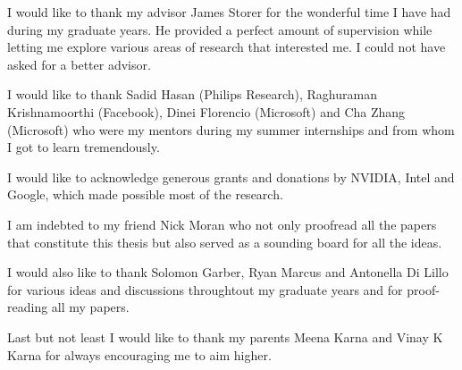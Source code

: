 I would like to thank my advisor James Storer for the wonderful time I have had during my graduate years. He provided a perfect amount of supervision while letting me explore various areas of research that interested me.
I could not have asked for a better advisor.

I would like to thank Sadid Hasan (Philips Research), Raghuraman Krishnamoorthi (Facebook), Dinei Florencio (Microsoft) and Cha Zhang (Microsoft) who were my mentors during my summer internships and from whom I got to learn tremendously.  

I would like to acknowledge generous grants and donations by NVIDIA, Intel and Google, which made possible most of the research.

I am indebted to my friend Nick Moran who not only proofread all the papers that constitute this thesis but also served as a sounding board for all the ideas.

I would also like to thank Solomon Garber, Ryan Marcus and Antonella Di Lillo for various ideas and discussions throughtout my graduate years and for proof-reading all my papers.

Last but not least I would like to thank my parents Meena Karna and Vinay K Karna for always encouraging me to aim higher.
